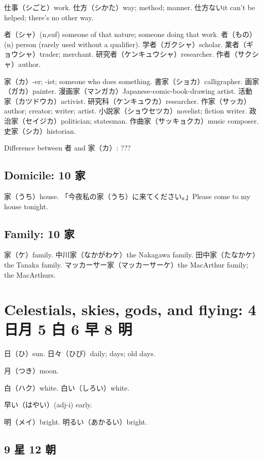 仕事（シごと）work.
仕方（シかた）way; method; manner.
仕方ないit can't be helped; there's no other way.

者（シャ）(n,suf) someone of that nature; someone doing that work.
者（もの）(n) person (rarely used without a qualifier).
学者（ガクシャ）scholar.
業者（ギョウシャ）trader; merchant.
研究者（ケンキュウシャ）researcher.
作者（サクシャ）author.

家（カ）-er; -ist; someone who does something.
書家（ショカ）calligrapher.
画家（ガカ）painter.
漫画家（マンガカ）Japanese-comic-book-drawing artist.
活動家（カツドウカ）activist.
研究科（ケンキュウカ）researcher.
作家（サッカ）author; creator; writer; artist.
小説家（ショウセツカ）novelist; fiction writer.
政治家（セイジカ）politician; statesman.
作曲家（サッキョクカ）music composer.
史家（シカ）historian.

Difference between 者 and 家（カ）: ???

\subsection{Domicile: 10 家}

家（うち）house.
「今夜私の家（うち）に来てください。」Please come to my house tonight.

\subsection{Family: 10 家}

家（ケ）family.
中川家（なかがわケ）the Nakagawa family.
田中家（たなかケ）the Tanaka family.
マッカーサー家（マッカーサーケ）the MacArthur family; the MacArthurs.

\section{Celestials, skies, gods, and flying: 4 日月 5 白 6 早 8 明}

日（ひ）sun.
日々（ひび）daily; days; old days.

月（つき）moon.

白（ハク）white.
白い（しろい）white.

早い（はやい）(adj-i) early.

明（メイ）bright.
明るい（あかるい）bright.

\subsection{9 星 12 朝}

